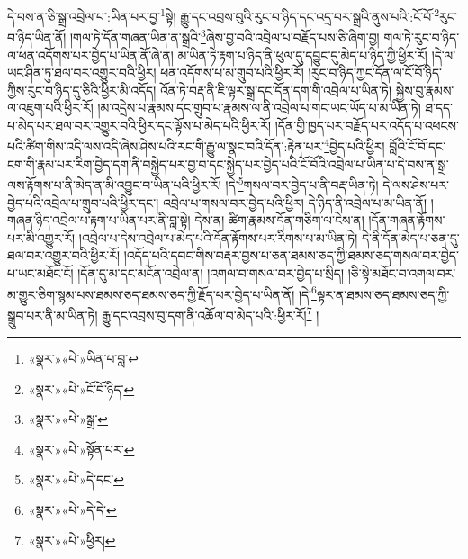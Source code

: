 དེ་བས་ན་ཅི་སྒྲ་འབྲེལ་པ་:ཡིན་པར་བྱ་\footnote{«སྣར་»«པེ་»ཡིན་པ་བླ་}སྟེ། རྒྱུ་དང་འབྲས་བུའི་རུང་བ་ཉིད་དང་འདྲ་བར་སྒྲའི་ནུས་པའི་:ངོ་བོ་\footnote{«སྣར་»«པེ་»ངོ་བོ་ཉིད་}རུང་བ་ཉིད་ཡིན་ནོ། །གལ་ཏེ་དོན་གཞན་ཡིན་ན་སྒྲའི་\footnote{«སྣར་»«པེ་»སྒྲ་}ཞེས་བྱ་བའི་འབྲེལ་པ་བརྗོད་པས་ཅི་ཞིག་བྱ། གལ་ཏེ་རུང་བ་ཉིད་ལ་ཕན་འདོགས་པར་བྱེད་པ་ཡིན་ནོ་ཞེ་ན། མ་ཡིན་ཏེ་རྟག་པ་ཉིད་ནི་ཕུལ་དུ་དབྱུང་དུ་མེད་པ་ཉིད་ཀྱི་ཕྱིར་རོ། །དེ་ལ་ཡང་ཤིན་ཏུ་ཐལ་བར་འགྱུར་བའི་ཕྱིར། ཕན་འདོགས་པ་མ་གྲུབ་པའི་ཕྱིར་རོ། །རུང་བ་ཉིད་ཀྱང་དོན་ལ་ངོ་བོ་ཉིད་ཀྱིས་རུང་བ་ཉིད་དུ་ཅིའི་ཕྱིར་མི་འདོད། འོན་ཏེ་བརྡ་ནི་ཇི་ལྟར་སྒྲ་དང་དོན་དག་གི་འབྲེལ་པ་ཡིན་ཏེ། སྐྱེས་བུ་རྣམས་ལ་འཇུག་པའི་ཕྱིར་རོ། །མ་འདྲེས་པ་རྣམས་དང་གྲུབ་པ་རྣམས་ལ་ནི་འབྲེལ་པ་གང་ཡང་ཡོད་པ་མ་ཡིན་ཏེ། ཐ་དད་པ་མེད་པར་ཐལ་བར་འགྱུར་བའི་ཕྱིར་དང་ལྟོས་པ་མེད་པའི་ཕྱིར་རོ། །དོན་གྱི་ཁྱད་པར་བརྗོད་པར་འདོད་པ་འཕངས་པའི་ཚིག་གིས་འདི་ལས་འདི་ཞེས་ཤེས་པའི་རང་གི་རྒྱུ་ལ་སྣང་བའི་དོན་:རྟེན་པར་\footnote{«སྣར་»«པེ་»སྟོན་པར་}བྱེད་པའི་ཕྱིར། བློའི་ངོ་བོ་དང་ངག་གི་རྣམ་པར་རིག་བྱེད་དག་ནི་བསྐྱེད་པར་བྱ་བ་དང་སྐྱེད་པར་བྱེད་པའི་ངོ་བོའི་འབྲེལ་པ་ཡིན་པ་དེ་བས་ན་སྒྲ་ལས་རྟོགས་པ་ནི་མེད་ན་མི་འབྱུང་བ་ཡིན་པའི་ཕྱིར་རོ། །དེ་\footnote{«སྣར་»«པེ་»དེ་དང་}གསལ་བར་བྱེད་པ་ནི་བརྡ་ཡིན་ཏེ། དེ་ལས་ཤེས་པར་བྱེད་པའི་འབྲེལ་པ་གྲུབ་པའི་ཕྱིར་དང་། འབྲེལ་པ་གསལ་བར་བྱེད་པའི་ཕྱིར། དེ་ཉིད་ནི་འབྲེལ་པ་མ་ཡིན་ནོ། །གཞན་ཉིད་འབྲེལ་པ་རྟག་པ་ཡིན་པར་ནི་བླ་སྟེ། དེས་ན། ཚིག་རྣམས་དོན་གཅིག་ལ་ངེས་ན། །དོན་གཞན་རྟོགས་པར་མི་འགྱུར་རོ། །འབྲེལ་པ་དེས་འབྲེལ་པ་མེད་པའི་དོན་རྟོགས་པར་རིགས་པ་མ་ཡིན་ཏེ། དེ་ནི་དོན་མེད་པ་ཅན་དུ་ཐལ་བར་འགྱུར་བའི་ཕྱིར་རོ། །འདོད་པའི་དབང་གིས་བརྡར་བྱས་པ་ཅན་ཐམས་ཅད་ཀྱི་ཐམས་ཅད་གསལ་བར་བྱེད་པ་ཡང་མཐོང་ངོ། །དོན་དུ་མ་དང་མངོན་འབྲེལ་ན། །འགལ་བ་གསལ་བར་བྱེད་པ་སྲིད། །ཅི་སྟེ་མཐོང་བ་འགལ་བར་མ་གྱུར་ཅིག་སྙམ་པས་ཐམས་ཅད་ཐམས་ཅད་ཀྱི་རྗོད་པར་བྱེད་པ་ཡིན་ནོ། །དེ་\footnote{«སྣར་»«པེ་»དེ་དེ་}ལྟར་ན་ཐམས་ཅད་ཐམས་ཅད་ཀྱི་སྒྲུབ་པར་ནི་མ་ཡིན་ཏེ། རྒྱུ་དང་འབྲས་བུ་དག་ནི་འཆོལ་བ་མེད་པའི་:ཕྱིར་རོ།\footnote{«སྣར་»«པེ་»ཕྱིར།} །

